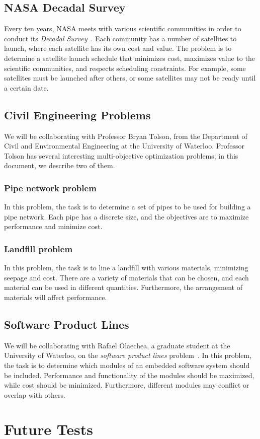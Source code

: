 \documentclass[11pt]{article}
\begin{document}
\subsection{NASA Decadal Survey}

Every ten years, NASA meets with various scientific communities in
order to conduct its \textit{Decadal Survey}~\cite{ref:nasa11}. Each
community has a number of satellites to launch, where each satellite
has its own cost and value. The problem is to determine a satellite
launch schedule that minimizes cost, maximizes value to the scientific
communities, and respects scheduling constraints. For example, some
satellites must be launched after others, or some satellites may not be
ready until a certain date.

\subsection{Civil Engineering Problems}

We will be collaborating with Professor Bryan Tolson, from the
Department of Civil and Environmental Engineering at the University of
Waterloo. Professor Tolson has several interesting multi-objective
optimization problems; in this document, we describe two of them.

\subsubsection{Pipe network problem}

In this problem, the task is to determine a set of pipes to be used for
building a pipe network. Each pipe has a discrete size, and the
objectives are to maximize performance and minimize cost.

\subsubsection{Landfill problem}

In this problem, the task is to line a landfill with various materials,
minimizing seepage and cost. There are a variety of materials that can
be chosen, and each material can be used in different quantities.
Furthermore, the arrangement of materials will affect performance.

\subsection{Software Product Lines}

We will be collaborating with Rafael Olaechea, a graduate student at
the University of Waterloo, on the \textit{software product lines}
problem~\cite{ref:Olaechea12}. In this problem, the task is to
determine which modules of an embedded software system should be
included. Performance and functionality of the modules should be
maximized, while cost should be minimized. Furthermore, different
modules may conflict or overlap with others.

\section{Future Tests}

\printbibliography[heading=bibintoc]
\end{document}
